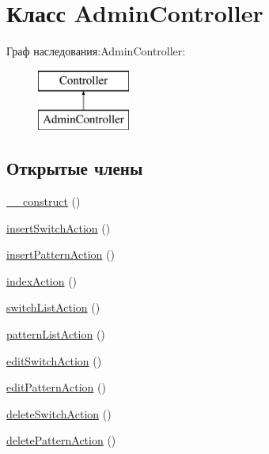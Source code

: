 \hypertarget{class_admin_controller}{\section{Класс Admin\-Controller}
\label{class_admin_controller}
}
Граф наследования\-:Admin\-Controller\-:\begin{figure}[H]
\begin{center}
\leavevmode
\includegraphics[height=2.000000cm]{class_admin_controller}
\end{center}
\end{figure}
\subsection*{Открытые члены}
\begin{DoxyCompactItemize}
\item 
\hyperlink{class_admin_controller_a095c5d389db211932136b53f25f39685}{\-\_\-\-\_\-construct} ()
\item 
\hyperlink{class_admin_controller_adb4f27979f2f36cd9188ae458e34915c}{insert\-Switch\-Action} ()
\item 
\hyperlink{class_admin_controller_a9490c2d9f54caed433fe639b66c09be1}{insert\-Pattern\-Action} ()
\item 
\hyperlink{class_admin_controller_a04f2101fe1cdc785b61219c2df753024}{index\-Action} ()
\item 
\hyperlink{class_admin_controller_aa9a72c1d52bf09c94a47acc614396c66}{switch\-List\-Action} ()
\item 
\hyperlink{class_admin_controller_a7ad9e2637892287ef12ffec159d61a78}{pattern\-List\-Action} ()
\item 
\hyperlink{class_admin_controller_a721d0b0c4b661a32e072273b53179f3b}{edit\-Switch\-Action} ()
\item 
\hyperlink{class_admin_controller_a3bb24927ecf883a21a72d717356018c9}{edit\-Pattern\-Action} ()
\item 
\hyperlink{class_admin_controller_a600ec48348ff40ad8700f7026271b61a}{delete\-Switch\-Action} ()
\item 
\hyperlink{class_admin_controller_a724748305a9984100d7e165737444be0}{delete\-Pattern\-Action} ()
\end{DoxyCompactItemize}
